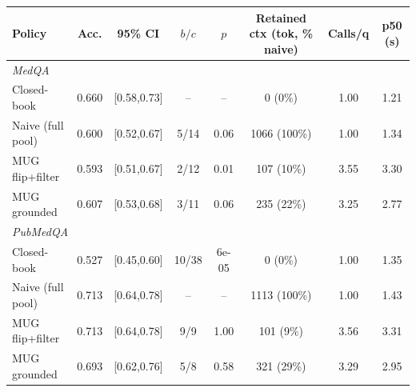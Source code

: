 \begin{tabular}{lccccccc}
\toprule
Policy & Acc. & 95\% CI & $b/c$ & $p$ & Retained ctx (tok, \% naive) & Calls/q & p50 (s) \\
\midrule
\multicolumn{8}{l}{\textit{MedQA}} \\
Closed-book & 0.660 & [0.58,0.73] & -- & -- & 0 (0\%) & 1.00 & 1.21 \\
Naive (full pool) & 0.600 & [0.52,0.67] & 5/14 & 0.06 & 1066 (100\%) & 1.00 & 1.34 \\
MUG flip+filter & 0.593 & [0.51,0.67] & 2/12 & 0.01 & 107 (10\%) & 3.55 & 3.30 \\
MUG grounded & 0.607 & [0.53,0.68] & 3/11 & 0.06 & 235 (22\%) & 3.25 & 2.77 \\
\midrule
\multicolumn{8}{l}{\textit{PubMedQA}} \\
Closed-book & 0.527 & [0.45,0.60] & 10/38 & 6e-05 & 0 (0\%) & 1.00 & 1.35 \\
Naive (full pool) & 0.713 & [0.64,0.78] & -- & -- & 1113 (100\%) & 1.00 & 1.43 \\
MUG flip+filter & 0.713 & [0.64,0.78] & 9/9 & 1.00 & 101 (9\%) & 3.56 & 3.31 \\
MUG grounded & 0.693 & [0.62,0.76] & 5/8 & 0.58 & 321 (29\%) & 3.29 & 2.95 \\
\bottomrule
\end{tabular}
